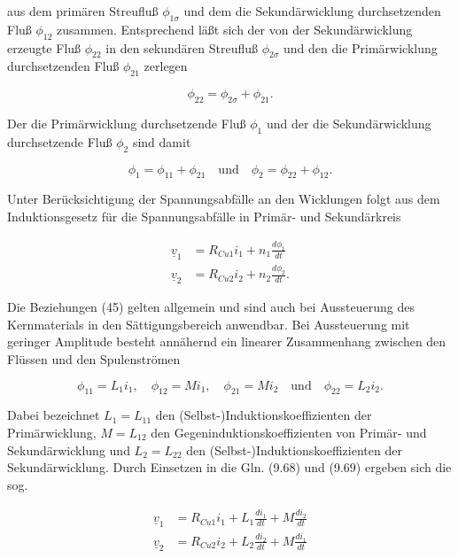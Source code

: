 \documentclass[
  ngerman,
  letterpaper,
]{scrbook}
\begin{document}
aus dem primären Streufluß \(\phi_{1\sigma}\) und dem die
Sekundärwicklung durchsetzenden Fluß \(\phi_{12}\) zusammen.
Entsprechend läßt sich der von der Sekundärwicklung erzeugte Fluß
\(\phi_{22}\) in den sekundären Streufluß \(\phi_{2\sigma}\) und den die
Primärwicklung durchsetzenden Fluß \(\phi_{21}\) zerlegen

\[
\phi_{22} = \phi_{2\sigma} + \phi_{21}.
\]

Der die Primärwicklung durchsetzende Fluß \(\phi_1\) und der die
Sekundärwicklung durchsetzende Fluß \(\phi_2\) sind damit

\[
\phi_1 = \phi_{11} + \phi_{21}  \quad\text{und}\quad  \phi_2 = \phi_{22} + \phi_{12}.
\]

Unter Berücksichtigung der Spannungsabfälle an den Wicklungen folgt aus
dem Induktionsgesetz für die Spannungsabfälle in Primär- und
Sekundärkreis

\begin{align}
\underline{v}_1 &= R_{Cu1} i_1 + n_1 \frac{d\phi_1}{dt} \\
\underline{v}_2 &= R_{Cu2} i_2 + n_2 \frac{d\phi_2}{dt}. 
\end{align}

Die Beziehungen (45) gelten allgemein und sind auch bei Aussteuerung des
Kernmaterials in den Sättigungsbereich anwendbar. Bei Aussteuerung mit
geringer Amplitude besteht annähernd ein linearer Zusammenhang zwischen
den Flüssen und den Spulenströmen

\[
\phi_{11} = L_1 i_1,\quad \phi_{12} = M i_1,\quad \phi_21 = M i_2\quad\text{und}\quad \phi_{22} = L_2 i_2. 
\]

Dabei bezeichnet \(L_1 = L_{11}\) den (Selbst-)Induktionskoeffizienten
der Primärwicklung, \(M = L_{12}\) den Gegeninduktionskoeffizienten von
Primär- und Sekundärwicklung und \(L_2 = L_{22}\) den
(Selbst-)Induktionskoeffizienten der Sekundärwicklung. Durch Einsetzen
in die Gln. (9.68) und (9.69) ergeben sich die sog.

\begin{tcolorbox}[enhanced jigsaw, titlerule=0mm, rightrule=.15mm, toprule=.15mm, colback=white, toptitle=1mm, bottomrule=.15mm, coltitle=black, leftrule=.75mm, arc=.35mm, colbacktitle=quarto-callout-note-color!10!white, opacityback=0, bottomtitle=1mm, colframe=quarto-callout-note-color-frame, opacitybacktitle=0.6, breakable, title=\textcolor{quarto-callout-note-color}{\faInfo}\hspace{0.5em}{Transformatorgleichungen}, left=2mm]

\begin{align}
\underline{v}_1 &= R_{Cu1} i_1 + L_1 \frac{di_1}{dt} + M \frac{di_2}{dt} \\
\underline{v}_2 &= R_{Cu2} i_2 + L_2 \frac{di_2}{dt} + M \frac{di_1}{dt} 
\end{align}

\end{tcolorbox}
\end{document}
